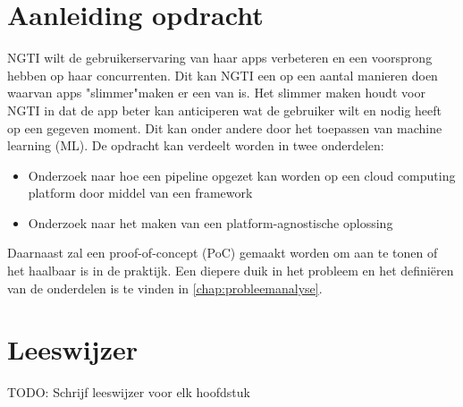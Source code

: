 \section{Aanleiding opdracht}\label{sec:aanleiding-opdracht}
NGTI wilt de gebruikerservaring van haar apps verbeteren en een voorsprong hebben op haar concurrenten. Dit kan NGTI een op een aantal manieren doen waarvan apps "slimmer"\space maken er een van is. Het slimmer maken houdt voor NGTI in dat de app beter kan anticiperen wat de gebruiker wilt en nodig heeft op een gegeven moment. Dit kan onder andere door het toepassen van machine learning (ML). De opdracht kan verdeelt worden in twee onderdelen:

\begin{itemize}
  \item Onderzoek naar hoe een pipeline opgezet kan worden op een cloud computing platform door middel van een framework
  \item Onderzoek naar het maken van een platform-agnostische oplossing
\end{itemize}

Daarnaast zal een proof-of-concept (PoC) gemaakt worden om aan te tonen of het haalbaar is in de praktijk. Een diepere duik in het probleem en het definiëren van de onderdelen is te vinden in \autoref{chap:probleemanalyse}.

\section{Leeswijzer}\label{sec:leeswijzer}
TODO: Schrijf leeswijzer voor elk hoofdstuk